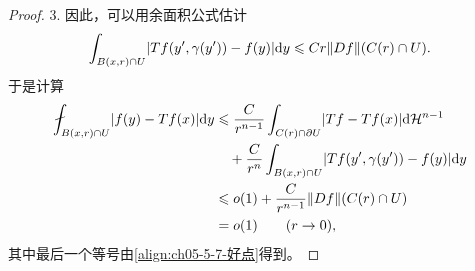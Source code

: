 \documentclass[../../main.tex]{subfiles}%
\begin{document}
\begin{proof}
3. 因此，可以用余面积公式估计 %
\begin{align*}
\int_{B(x,r)\cap U}\lvert Tf(y',\gamma(y'))-f(y)\rvert\mathrm{d} y\leqslant Cr\lVert Df\rVert(C(r)\cap U).
\end{align*}
于是计算
\begin{align*}
\fint_{B(x,r)\cap U}\lvert f(y)-Tf(x)\rvert\diff y&\leqslant\frac{C}{r^{n-1}}\int_{C(r)\cap\partial U}\lvert Tf-Tf(x)\rvert\diff\mathcal{H}^{n-1}\\
&\quad+\frac{C}{r^n}\int_{B(x,r)\cap U}\lvert Tf(y',\gamma(y'))-f(y)\rvert\diff y\\
&\leqslant o(1)+\frac{C}{r^{n-1}}\lVert Df\rVert(C(r)\cap U)\\
&=o(1)\qquad(r\to0),
\end{align*}
其中最后一个等号由\eqref{align:ch05-5-7-好点}得到。
\end{proof}
\end{document}
